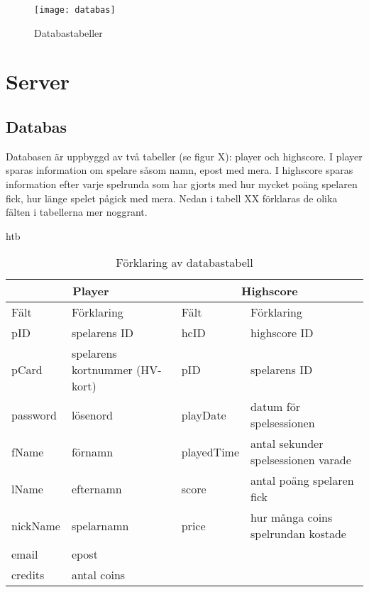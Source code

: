 \documentclass[12pt,fleqn,openany]{book} %
\begin{document}
\begin{wrapfigure}{r}{0.35\textwidth}
  \begin{center}
    \texttt{[image: databas]}
  \end{center}
  \caption{Databastabeller}
  \label{fig_databas}
\end{wrapfigure}

\section{Server}
\subsection{Databas}

Databasen är uppbyggd av två tabeller (se figur X): player och highscore. I player sparas information om spelare 
såsom namn, epost med mera. I highscore sparas information efter varje spelrunda som har gjorts med hur mycket 
poäng spelaren fick, hur länge spelet pågick med mera. Nedan i tabell XX förklaras de olika fälten i tabellerna mer noggrant.

\clearpage\newpage

\begin{table}{htb}
\centering
\begin{tabular}{ ||l|l|l|l|| } 
 \hline
 \multicolumn{2}{||c|}{Player} & \multicolumn{2}{|c||}{Highscore}  \\
 \hline
 Fält & Förklaring & Fält & Förklaring \\
 \hline\hline
 pID & spelarens ID & hcID & highscore ID \\
 pCard & spelarens kortnummer (HV-kort) & pID & spelarens ID \\
 password & lösenord & playDate & datum för spelsessionen \\
 fName & förnamn & playedTime & antal sekunder spelsessionen varade \\
 lName & efternamn & score & antal poäng spelaren fick \\
 nickName & spelarnamn & price & hur många coins spelrundan kostade \\
 email & epost & & \\
 credits & antal coins & & \\
 \hline\hline
\end{tabular}
\caption{Förklaring av databastabell}
\label{table_databas}
\end{table}
\end{document}
